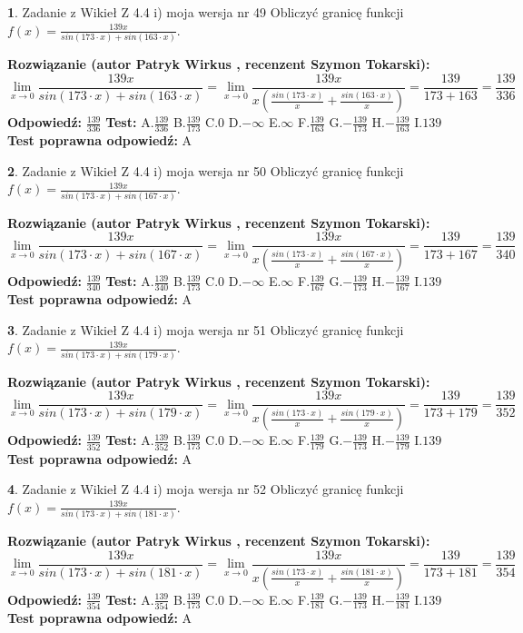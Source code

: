 \documentclass[12pt, a4paper]{article}
\theoremstyle{definition} %
\newtheorem{zad}{}
\newcommand{\zadStart}[1]{\begin{zad}#1\newline}
\newcommand{\zadStop}{\end{zad}}
\newcommand{\rozwStart}[2]{\noindent \textbf{Rozwiązanie (autor #1 , recenzent #2): }\newline}
\newcommand{\rozwStop}{\newline}
\newcommand{\odpStart}{\noindent \textbf{Odpowiedź:}\newline}
\newcommand{\odpStop}{\newline}
\newcommand{\testStart}{\noindent \textbf{Test:}\newline}
\newcommand{\testStop}{\newline}
\newcommand{\kluczStart}{\noindent \textbf{Test poprawna odpowiedź:}\newline}
\newcommand{\kluczStop}{\newline}
\begin{document}
\zadStart{Zadanie z Wikieł Z 4.4 i) moja wersja nr 49}
Obliczyć granicę funkcji $f(x)=\frac{139x}{sin(173\cdot x) +sin(163\cdot x)}$.
\zadStop
\rozwStart{Patryk Wirkus}{Szymon Tokarski}
$$\lim\limits_{x\to 0}\frac{139x}{sin(173\cdot x) +sin(163\cdot x)}=\lim\limits_{x\to 0}\frac{139x}{x(\frac{sin(173\cdot x)}{x}+\frac{sin(163\cdot x)}{x})}=\frac{139}{173+163} = \frac{139}{336}$$
\rozwStop
\odpStart
$\frac{139}{336}$
\odpStop
\testStart
A.$\frac{139}{336}$
B.$\frac{139}{173}$
C.$0$
D.$-\infty$
E.$\infty$
F.$\frac{139}{163}$
G.$-\frac{139}{173}$
H.$-\frac{139}{163}$
I.$139$
\testStop
\kluczStart
A
\kluczStop



\zadStart{Zadanie z Wikieł Z 4.4 i) moja wersja nr 50}
Obliczyć granicę funkcji $f(x)=\frac{139x}{sin(173\cdot x) +sin(167\cdot x)}$.
\zadStop
\rozwStart{Patryk Wirkus}{Szymon Tokarski}
$$\lim\limits_{x\to 0}\frac{139x}{sin(173\cdot x) +sin(167\cdot x)}=\lim\limits_{x\to 0}\frac{139x}{x(\frac{sin(173\cdot x)}{x}+\frac{sin(167\cdot x)}{x})}=\frac{139}{173+167} = \frac{139}{340}$$
\rozwStop
\odpStart
$\frac{139}{340}$
\odpStop
\testStart
A.$\frac{139}{340}$
B.$\frac{139}{173}$
C.$0$
D.$-\infty$
E.$\infty$
F.$\frac{139}{167}$
G.$-\frac{139}{173}$
H.$-\frac{139}{167}$
I.$139$
\testStop
\kluczStart
A
\kluczStop



\zadStart{Zadanie z Wikieł Z 4.4 i) moja wersja nr 51}
Obliczyć granicę funkcji $f(x)=\frac{139x}{sin(173\cdot x) +sin(179\cdot x)}$.
\zadStop
\rozwStart{Patryk Wirkus}{Szymon Tokarski}
$$\lim\limits_{x\to 0}\frac{139x}{sin(173\cdot x) +sin(179\cdot x)}=\lim\limits_{x\to 0}\frac{139x}{x(\frac{sin(173\cdot x)}{x}+\frac{sin(179\cdot x)}{x})}=\frac{139}{173+179} = \frac{139}{352}$$
\rozwStop
\odpStart
$\frac{139}{352}$
\odpStop
\testStart
A.$\frac{139}{352}$
B.$\frac{139}{173}$
C.$0$
D.$-\infty$
E.$\infty$
F.$\frac{139}{179}$
G.$-\frac{139}{173}$
H.$-\frac{139}{179}$
I.$139$
\testStop
\kluczStart
A
\kluczStop



\zadStart{Zadanie z Wikieł Z 4.4 i) moja wersja nr 52}
Obliczyć granicę funkcji $f(x)=\frac{139x}{sin(173\cdot x) +sin(181\cdot x)}$.
\zadStop
\rozwStart{Patryk Wirkus}{Szymon Tokarski}
$$\lim\limits_{x\to 0}\frac{139x}{sin(173\cdot x) +sin(181\cdot x)}=\lim\limits_{x\to 0}\frac{139x}{x(\frac{sin(173\cdot x)}{x}+\frac{sin(181\cdot x)}{x})}=\frac{139}{173+181} = \frac{139}{354}$$
\rozwStop
\odpStart
$\frac{139}{354}$
\odpStop
\testStart
A.$\frac{139}{354}$
B.$\frac{139}{173}$
C.$0$
D.$-\infty$
E.$\infty$
F.$\frac{139}{181}$
G.$-\frac{139}{173}$
H.$-\frac{139}{181}$
I.$139$
\testStop
\kluczStart
A
\kluczStop
\end{document}
